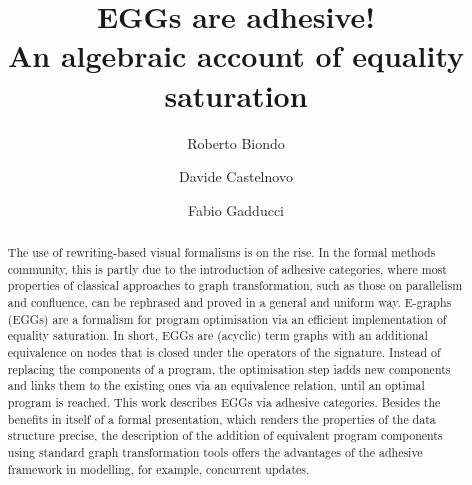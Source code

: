 \documentclass[3p]{elsarticle}
\title{EGGs are adhesive!\\ An algebraic account of equality saturation}
\theoremstyle{remark}
\theoremstyle{definition}
\begin{document}
\author[1]{Roberto Biondo}

\author[1]{Davide Castelnovo%
}

\author[1]{Fabio Gadducci}





\begin{abstract}
The use of rewriting-based visual formalisms is on the rise. 
%
In the formal methods community, this is partly due to the introduction of adhesive
categories, where most properties of classical approaches to graph transformation, 
such as those on parallelism and confluence, can be rephrased and proved in a general and 
uniform way.
%
E-graphs (EGGs) are a formalism for program optimisation 
via an efficient implementation of equality saturation. 
In short, EGGs are (acyclic) term graphs with an additional
equivalence on nodes that is closed under the operators of the signature.
Instead of replacing the components of a program, the optimisation step 
iadds new components and links them to 
the existing ones via an equivalence relation, until an optimal program is reached.
%
This work describes EGGs via adhesive categories. 
Besides the benefits in itself of a formal presentation, which renders the 
properties of the data structure precise, the description of the addition of equivalent 
program components using standard graph transformation tools offers the advantages 
of the adhesive framework in modelling, for example, concurrent updates.
%
\end{abstract}


\maketitle

\setcounter{secnumdepth}{4}
\setcounter{tocdepth}{4}
\tableofcontents
\end{document}
